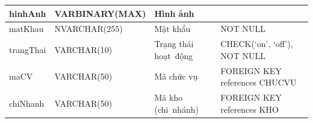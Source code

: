 \documentclass[a4paper,12pt]{report}
\begin{document}
\begin{center}
\begin{longtable}{|>{\centering\arraybackslash}p{3cm}|
        >{\centering\arraybackslash}p{4cm}|
        >{\centering\arraybackslash}p{4cm}|
        >{\centering\arraybackslash}p{4cm}|}
        \hline
        hinhAnh & VARBINARY(MAX) & Hình ảnh & \\                                                                                                                          
        \hline
        matKhau & NVARCHAR(255) & Mật khẩu & NOT NULL \\                                                                                                                          
        \hline
        trangThai &  VARCHAR(10)  & Trạng thái hoạt~động & CHECK(‘on’, ‘off’), NOT NULL \\
        \hline
        maCV & VARCHAR(50) & Mã chức vụ & FOREIGN KEY references CHUCVU \\                                                                                                                          
        \hline
        chiNhanh & VARCHAR(50) & Mã kho (chi~nhánh) & FOREIGN KEY references KHO \\                                                                                                                          
        \hline
    \end{longtable}
\end{center}
\end{document}
